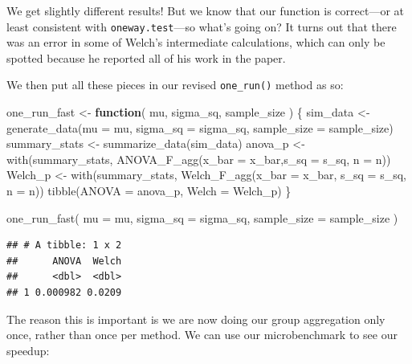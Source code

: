 \documentclass[
]{book}
\newenvironment{Shaded}{\begin{snugshade}}{\end{snugshade}}
\newcommand{\AttributeTok}[1]{\textcolor[rgb]{0.77,0.63,0.00}{#1}}
\newcommand{\ControlFlowTok}[1]{\textcolor[rgb]{0.13,0.29,0.53}{\textbf{#1}}}
\newcommand{\FunctionTok}[1]{\textcolor[rgb]{0.00,0.00,0.00}{#1}}
\newcommand{\NormalTok}[1]{#1}
\newcommand{\OtherTok}[1]{\textcolor[rgb]{0.56,0.35,0.01}{#1}}
\begin{document}
We get slightly different results! But we know that our function is correct---or at least consistent with \texttt{oneway.test}---so what's going on? It turns out that there was an error in some of Welch's intermediate calculations, which can only be spotted because he reported all of his work in the paper.

We then put all these pieces in our revised \texttt{one\_run()} method as so:

\begin{Shaded}
\begin{Highlighting}[]
\NormalTok{one\_run\_fast }\OtherTok{\textless{}{-}} \ControlFlowTok{function}\NormalTok{( mu, sigma\_sq, sample\_size ) \{}
\NormalTok{  sim\_data }\OtherTok{\textless{}{-}} \FunctionTok{generate\_data}\NormalTok{(}\AttributeTok{mu =}\NormalTok{ mu, }\AttributeTok{sigma\_sq =}\NormalTok{ sigma\_sq,}
                            \AttributeTok{sample\_size =}\NormalTok{ sample\_size)}
\NormalTok{  summary\_stats }\OtherTok{\textless{}{-}} \FunctionTok{summarize\_data}\NormalTok{(sim\_data)}
\NormalTok{  anova\_p }\OtherTok{\textless{}{-}} \FunctionTok{with}\NormalTok{(summary\_stats, }
                  \FunctionTok{ANOVA\_F\_agg}\NormalTok{(}\AttributeTok{x\_bar =}\NormalTok{ x\_bar,}\AttributeTok{s\_sq =}\NormalTok{ s\_sq, }\AttributeTok{n =}\NormalTok{ n))}
\NormalTok{  Welch\_p }\OtherTok{\textless{}{-}} \FunctionTok{with}\NormalTok{(summary\_stats, }
                  \FunctionTok{Welch\_F\_agg}\NormalTok{(}\AttributeTok{x\_bar =}\NormalTok{ x\_bar, }\AttributeTok{s\_sq =}\NormalTok{ s\_sq, }\AttributeTok{n =}\NormalTok{ n))}
  \FunctionTok{tibble}\NormalTok{(}\AttributeTok{ANOVA =}\NormalTok{ anova\_p, }\AttributeTok{Welch =}\NormalTok{ Welch\_p)}
\NormalTok{\}}

\FunctionTok{one\_run\_fast}\NormalTok{( }\AttributeTok{mu =}\NormalTok{ mu, }\AttributeTok{sigma\_sq =}\NormalTok{ sigma\_sq,}
              \AttributeTok{sample\_size =}\NormalTok{ sample\_size )}
\end{Highlighting}
\end{Shaded}

\begin{verbatim}
## # A tibble: 1 x 2
##      ANOVA  Welch
##      <dbl>  <dbl>
## 1 0.000982 0.0209
\end{verbatim}

The reason this is important is we are now doing our group aggregation only once, rather than once per method. We can use our microbenchmark to see our speedup:
\end{document}
